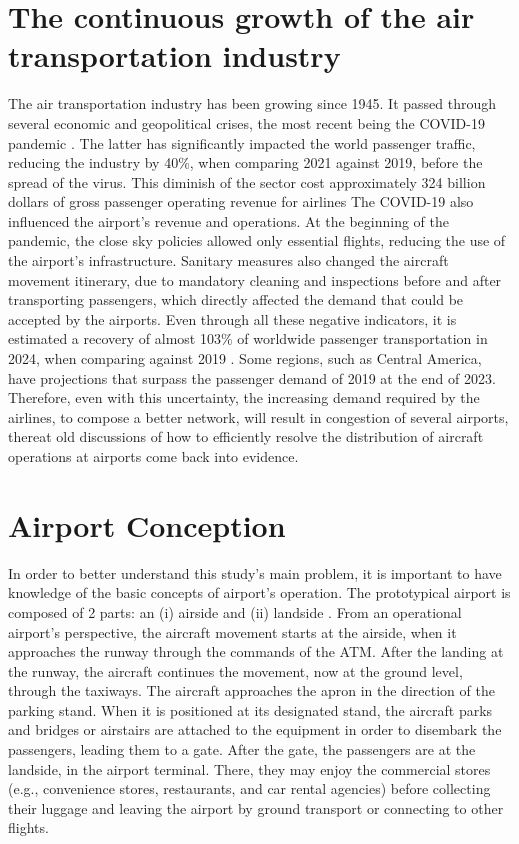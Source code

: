 
\label{section:Introduction}

\section{The continuous growth of the air transportation industry}%
\label{grow}

The air transportation industry has been growing since 1945. It passed through several economic and geopolitical crises, the most recent being the COVID-19 pandemic \cite{ACI_AirTravelDemand2025}. The latter has significantly impacted the world passenger traffic, reducing the industry by 40\%, when comparing 2021 against 2019, before the spread of the virus\cite{kalic2022impact}. This diminish of the sector cost approximately 324 billion dollars of gross passenger operating revenue for airlines \cite{ICAOEconomicImpact} The COVID-19 also influenced the airport's revenue and operations. At the beginning of the pandemic, the close sky policies allowed only essential flights, reducing the use of the airport's infrastructure. Sanitary measures also changed the aircraft movement itinerary, due to mandatory cleaning and inspections before and after transporting passengers, which directly affected the demand that could be accepted by the airports. Even through all these negative indicators, it is estimated a recovery of almost 103\% of worldwide passenger transportation in 2024, when comparing against 2019 \cite{IATA2024}. Some regions, such as Central America, have projections that surpass the passenger demand of 2019 at the end of 2023. Therefore, even with this uncertainty, the increasing demand required by the airlines, to compose a better network, will result in congestion of several airports, thereat old discussions of how to efficiently resolve the distribution of aircraft operations at airports come back into evidence.

\section{Airport Conception}
\label{concep}

In order to better understand this study's main problem, it is important to have knowledge of the basic concepts of airport’s operation. The prototypical airport is composed of 2 parts: an (i) airside and (ii) landside \cite{Lance2009}. From an operational airport’s perspective, the aircraft movement starts at the airside, when it approaches the runway through the commands of the \acrfull{ATM}. After the landing at the runway, the aircraft continues the movement, now at the ground level, through the taxiways. The aircraft approaches the apron in the direction of the parking stand. When it is positioned at its designated stand, the aircraft parks and bridges or airstairs are attached to the equipment in order to disembark the passengers, leading them to a gate. After the gate, the passengers are at the landside, in the airport terminal. There, they may enjoy the commercial stores (e.g., convenience stores, restaurants, and car rental agencies) before collecting their luggage and leaving the airport by ground transport or connecting to other flights. 


